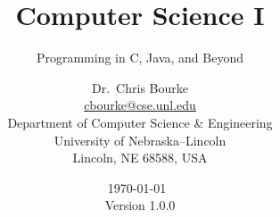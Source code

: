 
\usepackage[boxed,slide,linesnumbered,algochapter]{algorithm2e}
\DontPrintSemicolon
{} %
\IncMargin{5em}
\SetAlCapSkip{1em}
\setlength{\algomargin}{2em} %
\SetVlineSkip{0em}

\usepackage[yyyymmdd,hhmmss]{datetime}

\theoremstyle{definition}
\newtheorem{exer}{Exercise}

\newcommand{\Neg}{\ensuremath{\neg}}
\renewcommand{\And}{\ensuremath{\mathbin{\textsc{And}}}}
\newcommand{\Or}{\ensuremath{\mathbin{\textsc{Or}}}}
\newcommand{\True}{\emph{true}\xspace}
\newcommand{\False}{\emph{false}\xspace}
\newcommand{\Null}{\textsc{Null}}

\title{Computer Science I}
\subtitle{Programming in C, Java, and Beyond}
\author{Dr.\ Chris Bourke\\
        \href{mailto:cbourke@cse.unl.edu}{cbourke@cse.unl.edu} \\
        Department of Computer Science \& Engineering\\
        University of Nebraska--Lincoln\\
        Lincoln, NE 68588, USA
}

\date{\today\  \currenttime \\ Version 1.0.0}
